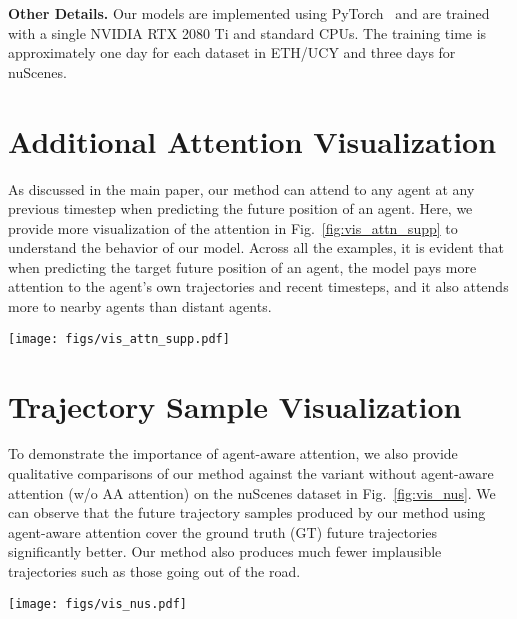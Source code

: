 \documentclass[10pt,twocolumn,letterpaper]{article}
\begin{document}
\vspace{2mm}
\noindent\textbf{Other Details.}
Our models are implemented using PyTorch~\cite{paszke2019pytorch} and are trained with a single NVIDIA RTX 2080 Ti and standard CPUs. The training time is approximately one day for each dataset in ETH/UCY and three days for nuScenes.


\section{Additional Attention Visualization}
\label{sec:supp_vis_attn}
As discussed in the main paper, our method can attend to any agent at any previous timestep when predicting the future position of an agent. Here, we provide more visualization of the attention in Fig.~\ref{fig:vis_attn_supp} to understand the behavior of our model. Across all the examples, it is evident that when predicting the target future position of an agent, the model pays more attention to the agent's own trajectories and recent timesteps, and it also attends more to nearby agents than distant agents.

\begin{figure*}[h]
\vspace{-3mm}
    \centering
    \texttt{[image: figs/vis\_attn\_supp.pdf]}
    \caption{\textbf{Attention Visualization on ETH/UCY.} We plot the attention to past (blue) and future (green) trajectory features of all agents when inferring a target position (red). Darker color means higher attention. When predicting the target future position of an agent, the model pays more attention to the agent's own trajectories and recent timesteps, and it also attends more to nearby agents than distant agents.}
    \label{fig:vis_attn_supp}
    \vspace{-3mm}
\end{figure*}


\section{Trajectory Sample Visualization}
 To demonstrate the importance of agent-aware attention, we also provide qualitative comparisons of our method against the variant without agent-aware attention (w/o AA attention) on the nuScenes dataset in Fig.~\ref{fig:vis_nus}. We can observe that the future trajectory samples produced by our method using agent-aware attention cover the ground truth (GT) future trajectories significantly better. Our method also produces much fewer implausible trajectories such as those going out of the road.

\begin{figure*}[h]
    \centering
    \texttt{[image: figs/vis\_nus.pdf]}
    \caption{\textbf{Trajectory Sample Visualization on nuScenes.} We compare our method against the variant without agent-aware attention (w/o AA attention). The future trajectory samples produced by our method using agent-aware attention cover the ground truth (GT) future trajectories significantly better. Our method also produces much fewer implausible trajectories such as those going out of the road.}
    \label{fig:vis_nus}
    \vspace{-2mm}
\end{figure*}
\end{document}
